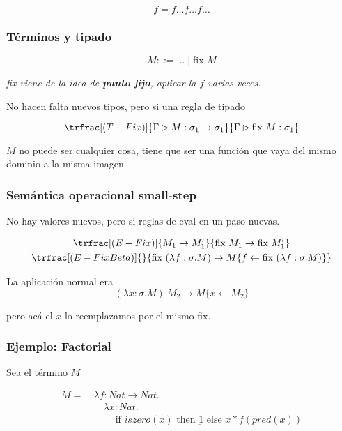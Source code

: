 \documentclass{report}
\theoremstyle{definition} %
\newenvironment{nota}[1]
    {\begin{leftbar}\textbf{#1}}
    {\end{leftbar}}
\newcommand{\tfunc}[2]{#1 \to #2}
\newcommand{\ifte}[3]{\ \text{if } #1 \text{ then } #2 \text{ else } #3}
\newcommand{\abs}[3]{\lambda #1 : #2 . #3}
\newcommand{\app}[2]{#1 \ #2} %
\newcommand{\sustOne}[3]{#1 \{ #2 \leftarrow #3 \}}
\newcommand{\tipa}[3]{#1 \rhd #2 : #3} %
\newcommand{\Gtipa}[2]{\tipa{\Gamma}{#1}{#2}}
\newcommand{\pred}[1]{pred(#1)}
\newcommand{\iszero}[1]{iszero(#1)}
\newcommand{\num}[1]{\underbar{#1}} %
\newcommand{\fix}[1]{\text{fix } #1}
\newcommand{\reduces}{\to}
\newcommand{\reduce}[2]{#1 \reduces #2}
\newcommand{\reduceToPrime}[1]{\reduce{#1}{#1'}}
\newcommand{\deriv}[3]{\trfrac[(#1)]{#2}{#3}}
\begin{document}
$$f = f \dots f \dots f \dots$$

\subsubsection{Términos y tipado}

\[
    M ::= \dots \mid \fix{M}
\]

\textit{fix viene de la idea de \textbf{punto fijo}, aplicar la $f$ varias
veces.}

No hacen falta nuevos tipos, pero si una regla de tipado

\[
    \deriv{T-Fix}
        {\Gtipa{M}{\tfunc{\sigma_1}{\sigma_1}}}
        {\Gtipa{\fix{M}}{\sigma_1}}
\]

$M$ no puede ser cualquier cosa, tiene que ser una función que vaya del mismo
dominio a la misma imagen.

\subsubsection{Semántica operacional small-step}

No hay valores nuevos, pero si reglas de eval en un paso nuevas.

\begin{gather*}
    \deriv{E-Fix}
        {\reduceToPrime{M_1}}
        {\reduce{\fix{M_1}}{\fix{M_1'}}}\\
    \deriv{E-FixBeta}{}
    {
        \reduce
        {\fix{(\abs{f}{\sigma}{M})}}
        {\sustOne{M}{f}{\fix{(\abs{f}{\sigma}{M})}}}
    }
\end{gather*}

\begin{nota}
    La aplicación normal era
    \[
        \reduce{\app{(\abs{x}{\sigma}{M})}{M_2}}{\sustOne{M}{x}{M_2}}
    \]

    pero acá el $x$ lo reemplazamos por el mismo fix.
\end{nota}

\subsubsection{Ejemplo: Factorial}

Sea el término $M$

\begin{align*}
    M =\ &\abs{f}{\tfunc{Nat}{Nat}}
        {\\ &\quad \abs{x}{Nat}
            {\\ &\qquad\ifte{\iszero{x}}{\num{1}}{x * f(\pred{x})}}}
\end{align*}
\end{document}
